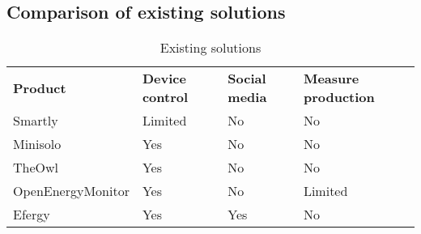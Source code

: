 \subsection{Comparison of existing solutions}

\begin{table}[H]
\centering
{}
\begin{tabular}{|l|l|l|l|}
\hline
\textbf{Product} & \textbf{Device control} & \textbf{Social media} & \textbf{Measure production}\\
Smartly & Limited & No  & No \\
Minisolo & Yes & No  & No \\
TheOwl & Yes & No & No \\
OpenEnergyMonitor & Yes & No  & Limited \\
Efergy & Yes & Yes &  No \\\hline
\end{tabular}
\caption{Existing solutions}
\label{tab:existingSolutions}
\end{table}
